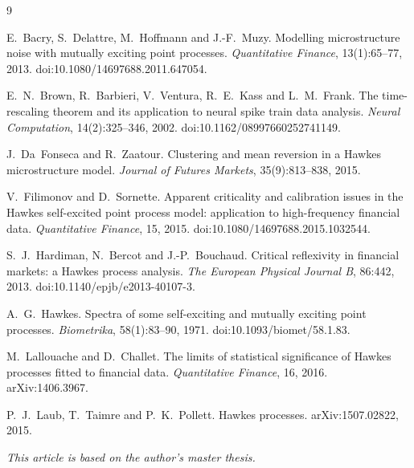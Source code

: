 \documentclass[a4paper,11pt]{article}
\begin{document}
\begin{thebibliography}{9}
\footnotesize

E.~Bacry, S.~Delattre, M.~Hoffmann and J.-F.~Muzy.
\newblock Modelling microstructure noise with mutually exciting point processes.
\newblock \emph{Quantitative Finance}, 13(1):65--77, 2013.
\newblock doi:10.1080/14697688.2011.647054.

E.~N.~Brown, R.~Barbieri, V.~Ventura, R.~E.~Kass and L.~M.~Frank.
\newblock The time-rescaling theorem and its application to neural spike train data analysis.
\newblock \emph{Neural Computation}, 14(2):325--346, 2002.
\newblock doi:10.1162/08997660252741149.

J.~Da~Fonseca and R.~Zaatour.
\newblock Clustering and mean reversion in a {Hawkes} microstructure model.
\newblock \emph{Journal of Futures Markets}, 35(9):813--838, 2015.

V.~Filimonov and D.~Sornette.
\newblock Apparent criticality and calibration issues in the {Hawkes} self-excited point process model: application to high-frequency financial data.
\newblock \emph{Quantitative Finance}, 15, 2015.
\newblock doi:10.1080/14697688.2015.1032544.

S.~J.~Hardiman, N.~Bercot and J.-P.~Bouchaud.
\newblock Critical reflexivity in financial markets: a {Hawkes} process analysis.
\newblock \emph{The European Physical Journal B}, 86:442, 2013.
\newblock doi:10.1140/epjb/e2013-40107-3.

A.~G.~Hawkes.
\newblock Spectra of some self-exciting and mutually exciting point processes.
\newblock \emph{Biometrika}, 58(1):83--90, 1971.
\newblock doi:10.1093/biomet/58.1.83.

M.~Lallouache and D.~Challet.
\newblock The limits of statistical significance of {Hawkes} processes fitted to financial data.
\newblock \emph{Quantitative Finance}, 16, 2016.
\newblock arXiv:1406.3967.

P.~J.~Laub, T.~Taimre and P.~K.~Pollett.
\newblock Hawkes processes.
\newblock arXiv:1507.02822, 2015.

\end{thebibliography}

\noindent\textit{This article is based on the author's master thesis.}
\end{document}
